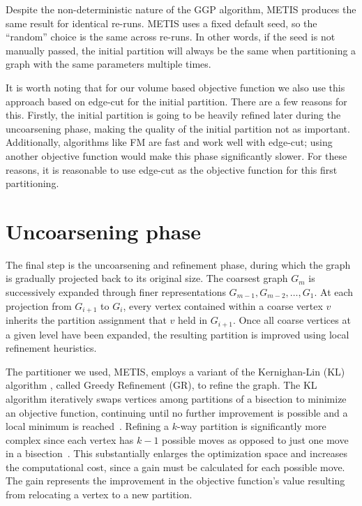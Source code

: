 Despite the non-deterministic nature of the GGP algorithm, METIS produces the same result for identical re-runs. METIS uses a fixed default seed, so the ``random'' choice is the same across re-runs. In other words, if the seed is not manually passed, the initial partition will always be the same when partitioning a graph with the same parameters multiple times. 

It is worth noting that for our volume based objective function we also use this approach based on edge-cut for the initial partition. There are a few reasons for this. Firstly, the initial partition is going to be heavily refined later during the uncoarsening phase, making the quality of the initial partition not as important. Additionally, algorithms like FM are fast and work well with edge-cut; using another objective function would make this phase significantly slower. For these reasons, it is reasonable to use edge-cut as the objective function for this first partitioning. 

\section{Uncoarsening phase} \label{sec:uncoarsening}
The final step is the uncoarsening and refinement phase, during which the graph is gradually projected back to its original size. The coarsest graph $G_m$ is successively expanded through finer representations $G_{m-1}, G_{m-2}, \dots, G_1$. At each projection from $G_{i+1}$ to $G_i$, every vertex contained within a coarse vertex $v$ inherits the partition assignment that $v$ held in $G_{i+1}$. Once all coarse vertices at a given level have been expanded, the resulting partition is improved using local refinement heuristics.

The partitioner we used, METIS, employs a variant of the Kernighan-Lin (KL) algorithm \cite{Kernighan_kl}, called Greedy Refinement (GR), to refine the graph. The KL algorithm iteratively swaps vertices among partitions of a bisection to minimize an objective function, continuing until no further improvement is possible and a local minimum is reached~\cite{karypis_multilevelk-way_1998}. Refining a $k$-way partition is significantly more complex since each vertex has $k - 1$ possible moves as opposed to just one move in a bisection~\cite{karypis_multilevelk-way_1998}. This substantially enlarges the optimization space and increases the computational cost, since a gain must be calculated for each possible move. The gain represents the improvement in the objective function's value resulting from relocating a vertex to a new partition.

